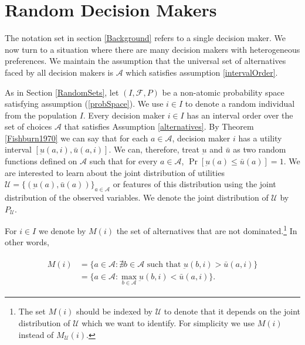 \documentclass[reqno]{article}
\begin{document}

\section{Random Decision Makers}
\label{randomDecisionMakers}

The notation set in section \ref{Background} refers to a single decision maker. We now turn to a situation where there are many decision makers with heterogeneous preferences. We maintain the assumption that the universal set of alternatives faced by all decision makers is $\mathcal{A}$ which satisfies
assumption \ref{intervalOrder}.

As in Section \ref{RandomSets}, let $(I,\mathcal{F} ,P)$ be a non-atomic probability space satisfying assumption (\ref{probSpace}). We use $i \in I$ to denote a random individual from the population $I$. Every decision maker $i\in I$ has an interval order over the set of choices $\mathcal{A}$ that satisfies Assumption \ref{alternatives}. By Theorem \ref{Fishburn1970} we can say that for each $a\in \mathcal{A}$, decision maker $i$ has a utility interval $\left[ \underbar{u} \left( a,i\right) ,\bar{u}\left( a,i\right) \right] $. We can, therefore, treat $\underbar{u}$ and $\bar{u}$ as two random functions defined on  $\mathcal{A}$ such that for every $a\in \mathcal{A}$, $\Pr \left[ \underbar{u}(a)\leq \bar{u}\left( a\right) \right] =1$. We are interested to learn about the joint distribution of utilities $\mathcal{U} = \{ \left(\underbar{u}\left( a\right) ,\bar{u}\left( a\right) \right) \}_{a \in \mathcal{A}}$ or features of this distribution using the joint distribution of the observed variables. We denote the joint distribution of $\mathcal{U}$ by $P_{\mathcal{U}}$.

For $i\in I$ we denote by $M(i)$ the set of alternatives that are not dominated.\footnote{The set $M(i)$ should be indexed by $\mathcal{U}$ to denote that it depends on the joint distribution of $\mathcal{U}$ which we want to identify. For simplicity we use $M(i)$ instead of $M_\mathcal{U}(i)$.} In other words, 

\begin{align}
\begin{split}
\label{choiceSet}
M(i) &=\{a \in \mathcal{A} : \nexists b \in \mathcal{A} \text{ such that } \underbar{u}(b,i)> \bar{u}(a,i) \} \\
&= \{a \in \mathcal{A} : \max\limits_{b \in \mathcal{A}} \underbar{u}(b,i) <  \bar{u}(a,i) \}.
\end{split}
\end{align}
\end{document}
